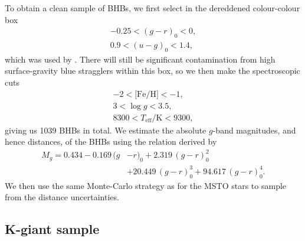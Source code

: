 \documentclass[useAMS,twocolumn,usenatbib]{mn2e}
\begin{document}
To obtain a clean sample of BHBs, we first select in the dereddened
colour-colour box
%
\begin{gather}
-0.25 < (g-r)_0 < 0, \nonumber \\
0.9 < (u-g)_0 < 1.4,
\end{gather}
%
which was used by \cite{De11}. There will still be significant contamination 
from high surface-gravity blue stragglers within this box, so we then make 
the spectroscopic cuts
%
\begin{gather}
-2 < \lbrack \mathrm{Fe/H} \rbrack < -1, \nonumber \\
3 < \log g < 3.5, \\
8300 < T_\mathrm{eff}/\mathrm{K} < 9300, \nonumber
\end{gather}
%
giving us 1039 BHBs in total. We estimate the absolute $g$-band
magnitudes, and hence distances, of the BHBs using the relation
derived by \cite{De11}
%
\begin{equation}
\begin{split}
M_g = 0.434 - 0.169\,(g{}&-r)_0+2.319\,(g-r)_0^2  \\
         {}&+20.449\,(g-r)_0^3+94.617\,(g-r)_0^4.
\end{split}
\end{equation}
%
We then use the same Monte-Carlo strategy as for the MSTO stars to sample 
from the distance uncertainties.


\subsection{K-giant sample}
\end{document}
